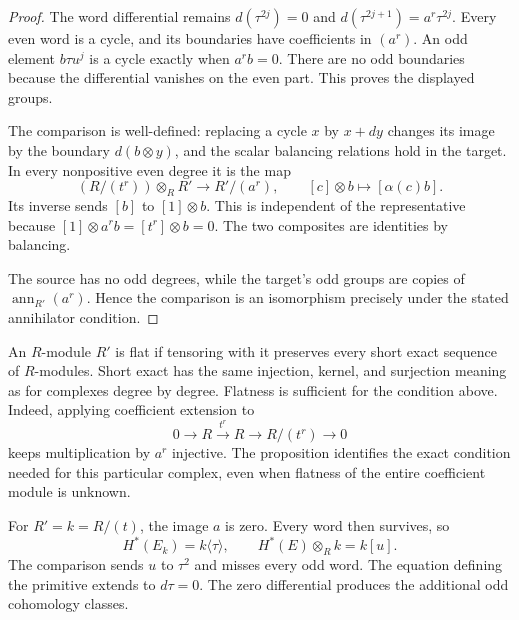 \begin{proof}
The word differential remains
$d(\tau^{2j})=0$ and $d(\tau^{2j+1})=a^r\tau^{2j}$.
Every even word is a cycle, and its boundaries have coefficients in
$(a^r)$. An odd element $b\tau u^j$ is a cycle exactly when $a^rb=0$.
There are no odd boundaries because the differential vanishes on the
even part. This proves the displayed groups.

The comparison is well-defined: replacing a cycle $x$ by $x+dy$
changes its image by the boundary $d(b\otimes y)$, and the scalar
balancing relations hold in the target.
In every nonpositive even degree it is the map
\[
 (R/(t^r))\otimes_R R'\longrightarrow R'/(a^r),
 \qquad [c]\otimes b\longmapsto[\alpha(c)b].
\]
Its inverse sends $[b]$ to $[1]\otimes b$.
This is independent of the representative because
$[1]\otimes a^r b=[t^r]\otimes b=0$.
The two composites are identities by balancing.

The source has no odd degrees, while the target's odd groups are copies
of $\operatorname{ann}_{R'}(a^r)$.
Hence the comparison is an isomorphism precisely under the stated
annihilator condition.
\end{proof}

An $R$-module $R'$ is flat if tensoring with it preserves every short
exact sequence of $R$-modules. Short exact has the same injection,
kernel, and surjection meaning as for complexes degree by degree.
Flatness is sufficient for the condition above.
Indeed, applying coefficient extension to
\[
 0\longrightarrow R\xrightarrow{\ t^r\ }R
 \longrightarrow R/(t^r)\longrightarrow0
\]
keeps multiplication by $a^r$ injective.
The proposition identifies the exact condition needed for this particular
complex, even when flatness of the entire coefficient module is unknown.

For $R'=k=R/(t)$, the image $a$ is zero.
Every word then survives, so
\[
 H^*(E_{k})=k\langle\tau\rangle,
 \qquad H^*(E)\otimes_R k=k[u].
\]
The comparison sends $u$ to $\tau^2$ and misses every odd word.
The equation defining the primitive extends to $d\tau=0$.
The zero differential produces the additional odd cohomology classes.
